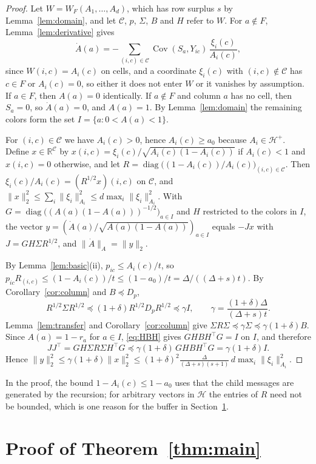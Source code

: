 \documentclass{amsart}
\numberwithin{equation}{section}
\theoremstyle{plain}
\theoremstyle{definition}
\theoremstyle{remark}
\newcommand{\R}{\mathbb{R}}
\newcommand{\Cov}{\operatorname{Cov}}
\newcommand{\diag}{\operatorname{diag}}
\newcommand{\cC}{\mathcal{C}}
\newcommand{\cH}{\mathcal{H}}
\newcommand{\T}{\top}
\begin{document}
\begin{proof}
Let $W=W_F(A_1,\dots,A_d)$, which has row surplus $s$ by Lemma~\ref{lem:domain}, and let $\cC$, $p$, $\Sigma$, $B$ and $H$ refer to $W$. For $a\notin F$, Lemma~\ref{lem:derivative} gives
\[
\dot A(a)=-\sum_{(i,c)\in\cC}\Cov(S_a,Y_{ic})\,\frac{\xi_i(c)}{A_i(c)},
\]
since $W(i,c)=A_i(c)$ on cells, and a coordinate $\xi_i(c)$ with $(i,c)\notin\cC$ has $c\in F$ or $A_i(c)=0$, so either it does not enter $W$ or it vanishes by assumption. If $a\in F$, then $A(a)=0$ identically. If $a\notin F$ and column $a$ has no cell, then $S_a=0$, so $\dot A(a)=0$, and $A(a)=1$. By Lemma~\ref{lem:domain} the remaining colors form the set $I=\{a:0<A(a)<1\}$.

For $(i,c)\in\cC$ we have $A_i(c)>0$, hence $A_i(c)\ge a_0$ because $A_i\in\cH^+$. Define $x\in\R^{\cC}$ by $x(i,c)=\xi_i(c)/\sqrt{A_i(c)(1-A_i(c))}$ if $A_i(c)<1$ and $x(i,c)=0$ otherwise, and let $R=\diag\bigl((1-A_i(c))/A_i(c)\bigr)_{(i,c)\in\cC}$. Then $\xi_i(c)/A_i(c)=(R^{1/2}x)(i,c)$ on $\cC$, and $\|x\|_2^2\le\sum_i\|\xi_i\|_{A_i}^2\le d\max_i\|\xi_i\|^2_{A_i}$. With $G=\diag\bigl((A(a)(1-A(a)))^{-1/2}\bigr)_{a\in I}$ and $H$ restricted to the colors in $I$, the vector $y=(\dot A(a)/\sqrt{A(a)(1-A(a))})_{a\in I}$ equals $-Jx$ with $J=GH\Sigma R^{1/2}$, and $\|\dot A\|_A=\|y\|_2$.

By Lemma~\ref{lem:basic}(ii), $p_{ic}\le A_i(c)/t$, so $p_{ic}R_{(i,c)}\le(1-A_i(c))/t\le(1-a_0)/t=\Delta/((\Delta+s)t)$. By Corollary~\ref{cor:column} and $B\preceq D_p$,
\[
R^{1/2}\Sigma R^{1/2}\preceq(1+\delta)R^{1/2}D_pR^{1/2}\preceq\gamma I,\qquad\gamma=\frac{(1+\delta)\Delta}{(\Delta+s)t}.
\]
Lemma~\ref{lem:transfer} and Corollary~\ref{cor:column} give $\Sigma R\Sigma\preceq\gamma\Sigma\preceq\gamma(1+\delta)B$. Since $A(a)=1-r_a$ for $a\in I$, \eqref{eq:HBH} gives $GHBH^\T G=I$ on $I$, and therefore
\[
JJ^\T=GH\Sigma R\Sigma H^\T G\preceq\gamma(1+\delta)\,GHBH^\T G=\gamma(1+\delta)I .
\]
Hence $\|y\|_2^2\le\gamma(1+\delta)\|x\|_2^2\le(1+\delta)^2\frac{\Delta}{(\Delta+s)(s+1)}\,d\max_i\|\xi_i\|_{A_i}^2$.
\end{proof}

In the proof, the bound $1-A_i(c)\le1-a_0$ uses that the child messages are generated by the recursion; for arbitrary vectors in $\cH$ the entries of $R$ need not be bounded, which is one reason for the buffer in Section~\ref{sec:proof}.

\section{Proof of Theorem~\ref{thm:main}}\label{sec:proof}
\end{document}
